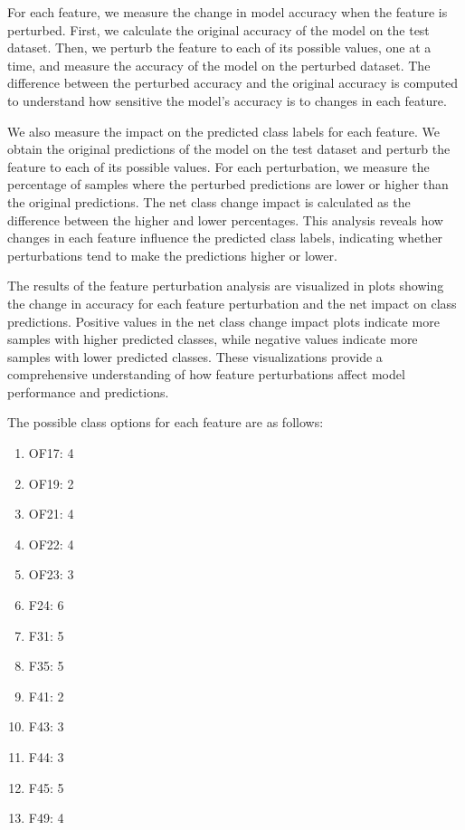 \documentclass[12pt,letterpaper]{article}
\begin{document}
For each feature, we measure the change in model accuracy when the feature is perturbed. First, we calculate the original accuracy of the model on the test dataset. Then, we perturb the feature to each of its possible values, one at a time, and measure the accuracy of the model on the perturbed dataset. The difference between the perturbed accuracy and the original accuracy is computed to understand how sensitive the model's accuracy is to changes in each feature.

We also measure the impact on the predicted class labels for each feature. We obtain the original predictions of the model on the test dataset and perturb the feature to each of its possible values. For each perturbation, we measure the percentage of samples where the perturbed predictions are lower or higher than the original predictions. The net class change impact is calculated as the difference between the higher and lower percentages. This analysis reveals how changes in each feature influence the predicted class labels, indicating whether perturbations tend to make the predictions higher or lower.

The results of the feature perturbation analysis are visualized in plots showing the change in accuracy for each feature perturbation and the net impact on class predictions. Positive values in the net class change impact plots indicate more samples with higher predicted classes, while negative values indicate more samples with lower predicted classes. These visualizations provide a comprehensive understanding of how feature perturbations affect model performance and predictions.

The possible class options for each feature are as follows:
\begin{multicols}{2}
\begin{enumerate}
    \item OF17: 4
    \item OF19: 2
    \item OF21: 4
    \item OF22: 4
    \item OF23: 3
    \item F24: 6
    \item F31: 5
    \item F35: 5
    \item F41: 2
    \item F43: 3
    \item F44: 3
    \item F45: 5
    \item F49: 4
\end{enumerate}
\end{multicols}
\end{document}

